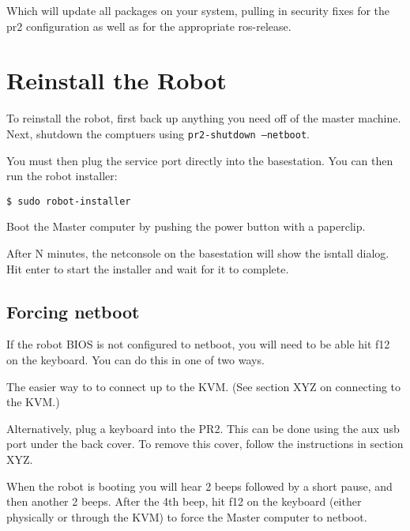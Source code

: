 Which will update all packages on your system, pulling in security fixes for
the pr2 configuration as well as for the appropriate ros-release.


\section{Reinstall the Robot}

To reinstall the robot, first back up anything you need off of the
master machine.  Next, shutdown the comptuers using
\texttt{pr2-shutdown --netboot}.

You must then plug the service port directly into the basestation.
You can then run the robot installer:

\begin{verbatim}
$ sudo robot-installer
\end{verbatim}

Boot the Master computer by pushing the power button with a paperclip.

After N minutes, the netconsole on the basestation will show the
isntall dialog.  Hit enter to start the installer and wait for it to
complete.

\subsection{Forcing netboot}

If the robot BIOS is not configured to netboot, you will need to be
able hit f12 on the keyboard.  You can do this in one of two ways.

The easier way to to connect up to the KVM.  (See section XYZ on connecting to the KVM.)

Alternatively, plug a keyboard into the PR2.  This can be done using
the aux usb port under the back cover.  To remove this cover, follow
the instructions in section XYZ.

When the robot is booting you will hear 2 beeps followed by a short
pause, and then another 2 beeps.  After the 4th beep, hit f12 on the
keyboard (either physically or through the KVM) to force the Master
computer to netboot.

